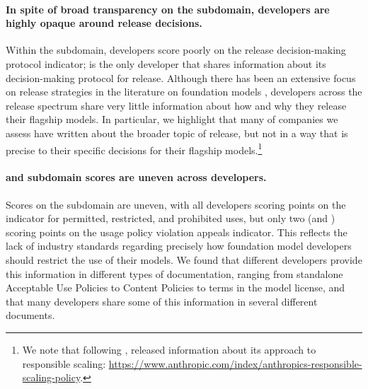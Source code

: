 \documentclass[screen, authorversion, acmsmall]{acmart}
\begin{document}
\paragraph{In spite of broad transparency on the \distribution subdomain, developers are highly opaque around release decisions.}
Within the \distribution subdomain, developers score poorly on the release decision-making protocol indicator; \huggingface is the only developer that shares information about its decision-making protocol for release.
Although there has been an extensive focus on release strategies in the literature on foundation models \citep{solaiman2019release, sastry2021release, shevlane2022structured, liang2022community-norms, liang2022condemning, solaiman2023gradient, widder2023open, seger2023open}, developers across the release spectrum share very little information about how and why they release their flagship models. 
In particular, we highlight that many of companies we assess have written about the broader topic of release, but not in a way that is precise to their specific decisions for their flagship models.\footnote{We note that following \informationfreezedate, \anthropic released information about its approach to responsible scaling: \url{https://www.anthropic.com/index/anthropics-responsible-scaling-policy}.}

\paragraph{\usagepolicy and \modelbehaviorpolicy subdomain scores are uneven across developers.}
Scores on the \usagepolicy subdomain are uneven, with all developers scoring points on the indicator for permitted, restricted, and prohibited uses, but only two (\openai and \inflection) scoring points on the usage policy violation appeals indicator.
This reflects the lack of industry standards regarding precisely how foundation model developers should restrict the use of their models. 
We found that different developers provide this information in different types of documentation, ranging from standalone Acceptable Use Policies to Content Policies to terms in the model license, and that many developers share some of this information in several different documents. 
\end{document}
